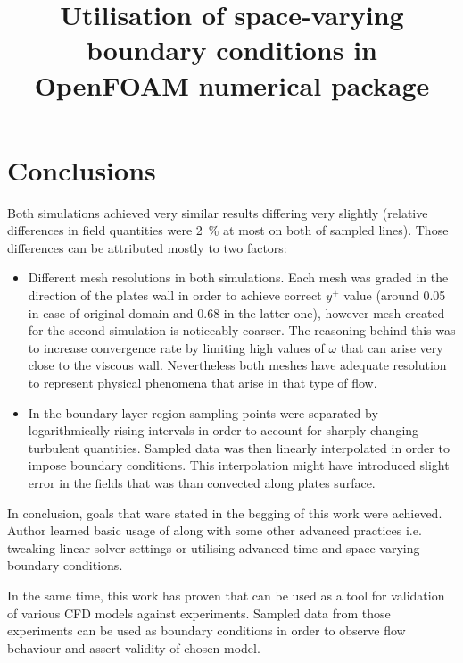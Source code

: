 \documentclass[a4paper]{report}
\title{Utilisation of space-varying boundary conditions in OpenFOAM  numerical package}
\begin{document}
    \placeTitlePage
    \setcounter{page}{1}
    \tableofcontents
    \listoffigures
    \clearpage
    \setcounter{page}{1}


    
    
    
    

    \chapter{Conclusions}
        Both simulations achieved very similar results differing very slightly (relative differences in field quantities were \SI{2}{\percent} at most on both of sampled lines). Those differences can be attributed mostly to two factors:
        \begin{itemize}
            \item Different mesh resolutions in  both simulations. 
            Each mesh was graded in the direction of the plates wall in order to achieve correct $y^+$ value (around \num{0,05} in case of original domain and \num{0.68} in the latter one), however mesh created for the second simulation is noticeably coarser.
            The reasoning behind this was to increase convergence rate by limiting high values of $\omega$ that can arise very close to the viscous wall.
            Nevertheless both meshes have adequate resolution to represent physical phenomena that arise in that type of flow.
            \item In the boundary layer region sampling points were separated by logarithmically rising intervals in order to account for sharply changing turbulent quantities. Sampled data was then linearly interpolated in order to impose boundary conditions. This interpolation might have introduced slight error in the fields that was than convected along plates surface.
        \end{itemize}

        In conclusion, goals that ware stated in the begging of this work were achieved. Author learned basic usage of \oFoam along with some other advanced practices i.e. tweaking linear solver settings or utilising advanced time and space varying boundary conditions.

        In the same time, this work has proven that \oFoam can be used as a tool for validation of various CFD models against experiments. Sampled data from those experiments can be used as boundary conditions in order to observe flow behaviour and assert validity of chosen model.
    
    \appendix

    
\end{document}
